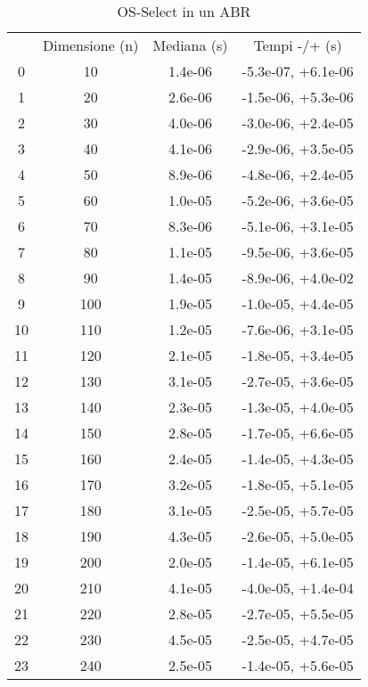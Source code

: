 \begin{table}
\centering
\caption{OS-Select in un ABR}
\label{OS-Select in un ABR}
\begin{adjustbox}{width=1\textwidth/2}
\begin{tabular}{|c|c|c|c|}
\hline
 & Dimensione (n) & Mediana (s) & Tempi -/+ (s) \\
0 & 10 & 1.4e-06 & -5.3e-07, +6.1e-06 \\
\cline{1-4}
1 & 20 & 2.6e-06 & -1.5e-06, +5.3e-06 \\
\cline{1-4}
2 & 30 & 4.0e-06 & -3.0e-06, +2.4e-05 \\
\cline{1-4}
3 & 40 & 4.1e-06 & -2.9e-06, +3.5e-05 \\
\cline{1-4}
4 & 50 & 8.9e-06 & -4.8e-06, +2.4e-05 \\
\cline{1-4}
5 & 60 & 1.0e-05 & -5.2e-06, +3.6e-05 \\
\cline{1-4}
6 & 70 & 8.3e-06 & -5.1e-06, +3.1e-05 \\
\cline{1-4}
7 & 80 & 1.1e-05 & -9.5e-06, +3.6e-05 \\
\cline{1-4}
8 & 90 & 1.4e-05 & -8.9e-06, +4.0e-02 \\
\cline{1-4}
9 & 100 & 1.9e-05 & -1.0e-05, +4.4e-05 \\
\cline{1-4}
10 & 110 & 1.2e-05 & -7.6e-06, +3.1e-05 \\
\cline{1-4}
11 & 120 & 2.1e-05 & -1.8e-05, +3.4e-05 \\
\cline{1-4}
12 & 130 & 3.1e-05 & -2.7e-05, +3.6e-05 \\
\cline{1-4}
13 & 140 & 2.3e-05 & -1.3e-05, +4.0e-05 \\
\cline{1-4}
14 & 150 & 2.8e-05 & -1.7e-05, +6.6e-05 \\
\cline{1-4}
15 & 160 & 2.4e-05 & -1.4e-05, +4.3e-05 \\
\cline{1-4}
16 & 170 & 3.2e-05 & -1.8e-05, +5.1e-05 \\
\cline{1-4}
17 & 180 & 3.1e-05 & -2.5e-05, +5.7e-05 \\
\cline{1-4}
18 & 190 & 4.3e-05 & -2.6e-05, +5.0e-05 \\
\cline{1-4}
19 & 200 & 2.0e-05 & -1.4e-05, +6.1e-05 \\
\cline{1-4}
20 & 210 & 4.1e-05 & -4.0e-05, +1.4e-04 \\
\cline{1-4}
21 & 220 & 2.8e-05 & -2.7e-05, +5.5e-05 \\
\cline{1-4}
22 & 230 & 4.5e-05 & -2.5e-05, +4.7e-05 \\
\cline{1-4}
23 & 240 & 2.5e-05 & -1.4e-05, +5.6e-05 \\

\end{tabular}
\end{adjustbox}
\end{table}
